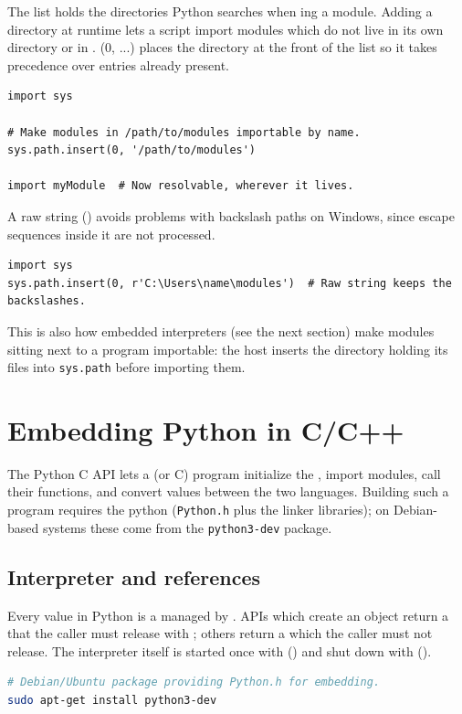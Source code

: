 The  list holds the directories Python searches when ing a module. Adding a directory at runtime lets a script import modules which do not live in its own directory or in . (0, ...) places the directory at the front of the list so it takes precedence over entries already present.
\begin{lstlisting}
import sys

# Make modules in /path/to/modules importable by name.
sys.path.insert(0, '/path/to/modules')

import myModule  # Now resolvable, wherever it lives.
\end{lstlisting}
A raw string () avoids problems with backslash paths on Windows, since escape sequences inside it are not processed.
\begin{lstlisting}
import sys
sys.path.insert(0, r'C:\Users\name\modules')  # Raw string keeps the backslashes.
\end{lstlisting}
This is also how embedded interpreters (see the next section) make modules sitting next to a program importable: the host inserts the directory holding its files into \texttt{sys.path} before importing them.

\section{Embedding Python in C/C++}

The Python C API lets a  (or C) program initialize the , import modules, call their functions, and convert values between the two languages. Building such a program requires the python  (\texttt{Python.h} plus the linker libraries); on Debian-based systems these come from the \texttt{python3-dev} package.

\subsection{Interpreter and references}

Every value in Python is a  managed by . APIs which create an object return a  that the caller must release with ; others return a  which the caller must not release. The interpreter itself is started once with () and shut down with ().
\begin{lstlisting}[language=Bash, style=shellstyle]
# Debian/Ubuntu package providing Python.h for embedding.
sudo apt-get install python3-dev
\end{lstlisting}

